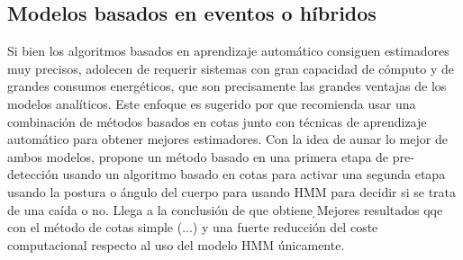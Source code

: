 \subsection{Modelos basados en eventos o híbridos}\label{sec:arte:modelos_hybridos}

Si bien los algoritmos basados en aprendizaje automático consiguen estimadores muy precisos, adolecen de requerir sistemas con gran capacidad de cómputo y de grandes consumos energéticos, que son precisamente las grandes ventajas de los modelos analíticos. Este enfoque es sugerido por \cite[p.~9]{Aziz2017b} que recomienda usar una combinación de métodos basados en cotas junto con técnicas de aprendizaje automático para obtener mejores estimadores. Con la idea de aunar lo mejor de ambos modelos,  propone un método basado en una primera etapa de pre-detección usando un algoritmo basado en cotas para activar una segunda etapa usando la postura o ángulo del cuerpo para usando HMM para decidir si se trata de una caída o no. Llega a la conclusión de que obtiene ̣{Mejores resultados qqe con el método de cotas simple (...) y una fuerte reducción del coste computacional respecto al uso del modelo HMM únicamente}.

